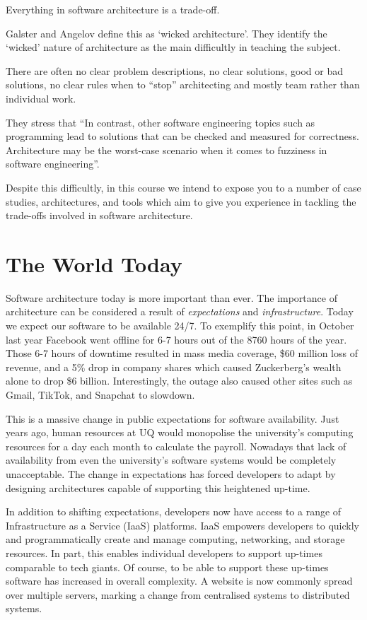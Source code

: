 \begin{definition}
Everything in software architecture is a trade-off.
\end{definition}

Galster and Angelov \cite{wicked-architecture} define this as `wicked architecture'.
They identify the `wicked' nature of architecture as the main difficultly in teaching the subject.

\begin{definition}
There are often no clear problem descriptions, no clear solutions, good or bad solutions, no clear rules when to ``stop'' architecting
and mostly team rather than individual work.
\end{definition}

They stress that ``In contrast, other software engineering topics such as programming lead to solutions that can be checked and measured for correctness.
Architecture may be the worst-case scenario when it comes to fuzziness in software engineering''.

Despite this difficultly, in this course we intend to expose you to a number of case studies, architectures,
and tools which aim to give you experience in tackling the trade-offs involved in software architecture.

\section{The World Today}
Software architecture today is more important than ever.
The importance of architecture can be considered a result of \textsl{expectations} and \textsl{infrastructure}.
Today we expect our software to be available 24/7.
To exemplify this point, in October last year Facebook went offline for 6-7 hours out of the 8760 hours of the year.
Those 6-7 hours of downtime resulted in mass media coverage, \$60 million loss of revenue,
and a 5\% drop in company shares which caused Zuckerberg's wealth alone to drop \$6 billion.
Interestingly, the outage also caused other sites such as Gmail, TikTok, and Snapchat to slowdown.

This is a massive change in public expectations for software availability.
Just  years ago,
human resources at UQ would monopolise the university's computing resources for a day each month to calculate the payroll.
Nowadays that lack of availability from even the university's software systems would be completely unacceptable.
The change in expectations has forced developers to adapt by designing architectures capable of supporting this heightened up-time.

In addition to shifting expectations, developers now have access to a range of Infrastructure as a Service (IaaS) platforms.
IaaS empowers developers to quickly and programmatically create and manage computing, networking, and storage resources.
In part, this enables individual developers to support up-times comparable to tech giants.
Of course, to be able to support these up-times software has increased in overall complexity.
A website is now commonly spread over multiple servers, marking a change from centralised systems to distributed systems.

